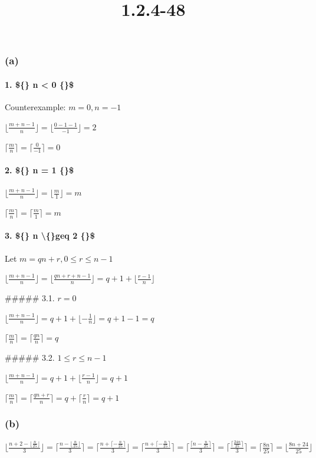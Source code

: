 \documentclass{article}
\title{1.2.4-48}
\begin{document}
\maketitle

\subsubsection*{(a)}

\paragraph*{1. \$\{\} n < 0 \{\}\$}

Counterexample: \( m = 0, n = -1 \)

\( \lfloor{\frac{m+n-1}{n}}\rfloor = \lfloor{\frac{0-1-1}{-1}}\rfloor = 2 \)

\( \lceil{\frac{m}{n}}\rceil = \lceil{\frac{0}{-1}}\rceil = 0 \)

\paragraph*{2. \$\{\} n = 1 \{\}\$}

\( \lfloor{\frac{m+n-1}{n}}\rfloor = \lfloor{\frac{m}{1}}\rfloor = m \)

\( \lceil{\frac{m}{n}}\rceil = \lceil{\frac{m}{1}}\rceil = m \)

\paragraph*{3. \$\{\} n \textbackslash\{\}geq 2 \{\}\$}

Let \( m = qn+r, 0 \leq r \leq n - 1 \)

\( \lfloor{\frac{m+n-1}{n}}\rfloor = \lfloor{\frac{qn+r+n-1}{n}}\rfloor = q + 1 + \lfloor{\frac{r-1}{n}}\rfloor \)

##### 3.1. \( r = 0 \)

\( \lfloor{\frac{m+n-1}{n}}\rfloor = q + 1 + \lfloor{-\frac{1}{n}}\rfloor = q + 1 - 1 = q \)

\( \lceil{\frac{m}{n}}\rceil = \lceil{\frac{qn}{n}}\rceil = q \)

##### 3.2. \( 1 \leq r \leq n - 1 \)

\( \lfloor{\frac{m+n-1}{n}}\rfloor = q + 1 + \lfloor{\frac{r-1}{n}}\rfloor = q + 1 \)

\( \lceil{\frac{m}{n}}\rceil = \lceil{\frac{qn+r}{n}}\rceil = q + \lceil{\frac{r}{n}}\rceil = q + 1 \)

\subsubsection*{(b)}

\( \lfloor{\frac{n+2 - \lfloor{\frac{n}{25}}\rfloor}{3}}\rfloor = \lceil{\frac{n - \lfloor{\frac{n}{25}}\rfloor}{3}}\rceil = \lceil{\frac{n + \lceil{-\frac{n}{25}}\rceil}{3}}\rfloor = \lceil{\frac{n + \lceil{-\frac{n}{25}}\rceil}{3}}\rceil = \lceil{\frac{\lceil{n-\frac{n}{25}}\rceil}{3}}\rceil = \lceil{\frac{\lceil{\frac{24n}{25}}\rceil}{3}}\rceil = \lceil{\frac{8n}{25}}\rceil = \lfloor{\frac{8n+24}{25}}\rfloor \)
\end{document}
